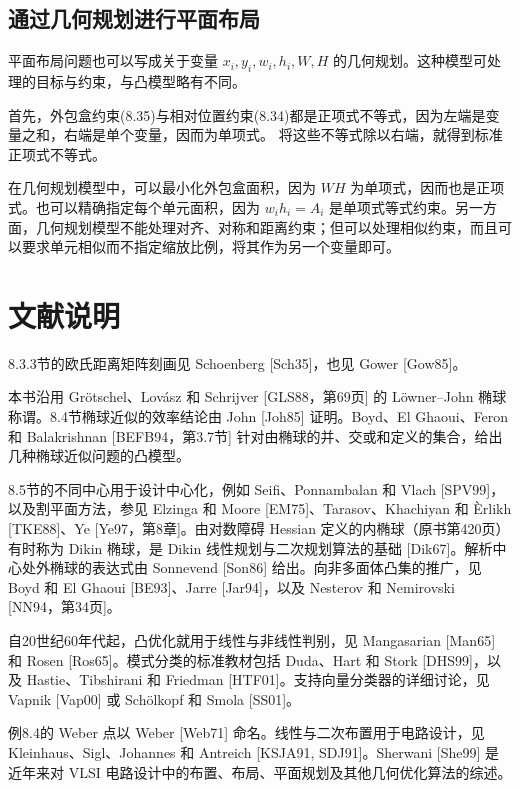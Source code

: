 \subsection{通过几何规划进行平面布局}
平面布局问题也可以写成关于变量 $x_i,y_i,w_i,h_i,W,H$ 的几何规划。这种模型可处理的目标与约束，与凸模型略有不同。

首先，外包盒约束(8.35)与相对位置约束(8.34)都是正项式不等式，因为左端是变量之和，右端是单个变量，因而为单项式。
将这些不等式除以右端，就得到标准正项式不等式。

在几何规划模型中，可以最小化外包盒面积，因为 $WH$ 为单项式，因而也是正项式。也可以精确指定每个单元面积，因为 $w_ih_i=A_i$ 是单项式等式约束。另一方面，几何规划模型不能处理对齐、对称和距离约束；但可以处理相似约束，而且可以要求单元相似而不指定缩放比例，将其作为另一个变量即可。
\section*{文献说明}
8.3.3节的欧氏距离矩阵刻画见 Schoenberg [Sch35]，也见 Gower [Gow85]。

本书沿用 Grötschel、Lovász 和 Schrijver [GLS88，第69页] 的 Löwner--John 椭球称谓。8.4节椭球近似的效率结论由 John [Joh85] 证明。Boyd、El Ghaoui、Feron 和 Balakrishnan [BEFB94，第3.7节] 针对由椭球的并、交或和定义的集合，给出几种椭球近似问题的凸模型。

8.5节的不同中心用于设计中心化，例如 Seifi、Ponnambalan 和 Vlach [SPV99]，以及割平面方法，参见 Elzinga 和 Moore [EM75]、Tarasov、Khachiyan 和 Èrlikh [TKE88]、Ye [Ye97，第8章]。由对数障碍 Hessian 定义的内椭球（原书第420页）有时称为 Dikin 椭球，是 Dikin 线性规划与二次规划算法的基础 [Dik67]。解析中心处外椭球的表达式由 Sonnevend [Son86] 给出。向非多面体凸集的推广，见 Boyd 和 El Ghaoui [BE93]、Jarre [Jar94]，以及 Nesterov 和 Nemirovski [NN94，第34页]。

自20世纪60年代起，凸优化就用于线性与非线性判别，见 Mangasarian [Man65] 和 Rosen [Ros65]。模式分类的标准教材包括 Duda、Hart 和 Stork [DHS99]，以及 Hastie、Tibshirani 和 Friedman [HTF01]。支持向量分类器的详细讨论，见 Vapnik [Vap00] 或 Schölkopf 和 Smola [SS01]。

例8.4的 Weber 点以 Weber [Web71] 命名。线性与二次布置用于电路设计，见 Kleinhaus、Sigl、Johannes 和 Antreich [KSJA91, SDJ91]。Sherwani [She99] 是近年来对 VLSI 电路设计中的布置、布局、平面规划及其他几何优化算法的综述。

